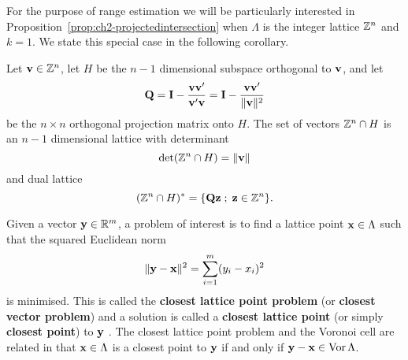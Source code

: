 For the purpose of range estimation we will be particularly interested in Proposition~\ref{prop:ch2-projectedintersection} when $\Lambda$ is the integer lattice ${\mathbb Z}^n$ and $k = 1$.  We state this special case in the following corollary.

\begin{corollary} \label{cor:intlatticedim1}
Let $\mathbf{v}\in{\mathbb Z}^n$, let $H$ be the $n-1$ dimensional subspace orthogonal to $\mathbf{v}$, and let
\[
\mathbf{Q} = \mathbf{I} - \frac{\mathbf{v}\mathbf{v}^\prime}{\mathbf{v}^\prime\mathbf{v}} = \mathbf{I} - \frac{\mathbf{v}\mathbf{v}^\prime}{\|\mathbf{v}\|^2}
\]
be the $n\times n$ orthogonal projection matrix onto $H$.  The set of vectors ${\mathbb Z}^n\cap H$ is an $n-1$ dimensional lattice with determinant 
\[
\det({\mathbb Z}^n \cap H) = \|\mathbf{v}\|
\]
and dual lattice
\[
({\mathbb Z}^n \cap H)^* = \{ \mathbf{Q} \mathbf{z} \; ; \; \mathbf{z} \in {\mathbb Z}^n \}.
\]
\end{corollary}




Given a vector $\mathbf{y} \in {\mathbb R}^m$, a problem of interest is to find a lattice point $\mathbf{x} \in \Lambda$ such that the squared Euclidean norm
\[
\| \mathbf{y} - \mathbf{x} \|^2 = \sum_{i=1}^m (y_i - x_i)^2 
\]  
is minimised.  This is called the \textbf{closest lattice point problem} (or \textbf{closest vector problem}) and a solution is called a \textbf{closest lattice point} (or simply \textbf{closest point}) to $\mathbf{y}$ \cite{Agrell2002,McKilliam2009CoxeterLattices,MicciancioVoulgaris_deterministic_jv_2013,McKilliam_closest_point_lattice_first_kind_2014}.  The closest lattice point problem and the Voronoi cell are related in that $\mathbf{x}\in\Lambda$ is a closest point to $\mathbf{y}$ if and only if $\mathbf{y} - \mathbf{x} \in \operatorname{Vor}\Lambda$.  

